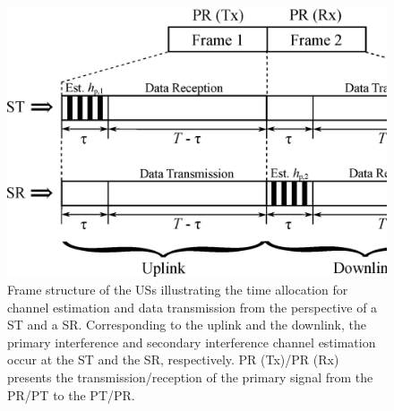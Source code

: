 \begin{figure}[!ht]
\centering
\includegraphics[width = \columnwidth]{figures/Frame_Structure}
\caption{Frame structure of the USs illustrating the time allocation for channel estimation and data transmission from the perspective of a ST and a SR. Corresponding to the uplink and the downlink, the primary interference and secondary interference channel estimation occur at the ST and the SR, respectively. PR (Tx)/PR (Rx) presents the transmission/reception of the primary signal from the PR/PT to the PT/PR.} 
\label{fig:fs}
\end{figure}



